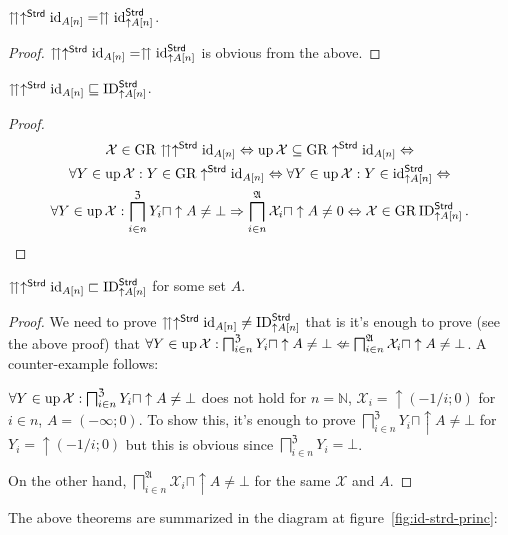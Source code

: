 \begin{prop}
$\upuparrows\uparrow^{\mathsf{Strd}}\operatorname{id}_{A[n]}=\upuparrows\operatorname{id}_{\uparrow A[n]}^{\mathsf{Strd}}$.\end{prop}
\begin{proof}
$\upuparrows\uparrow^{\mathsf{Strd}}\operatorname{id}_{A[n]}=\upuparrows\operatorname{id}_{\uparrow A[n]}^{\mathsf{Strd}}$
is obvious from the above.\end{proof}
\begin{prop}
$\upuparrows\uparrow^{\mathsf{Strd}}\operatorname{id}_{A[n]}\sqsubseteq\operatorname{ID}_{\uparrow A[n]}^{\mathsf{Strd}}$.\end{prop}
\begin{proof}
~
\begin{multline*}
\mathcal{X}\in\operatorname{GR}\upuparrows\uparrow^{\mathsf{Strd}}\operatorname{id}_{A[n]}\Leftrightarrow\operatorname{up}\mathcal{X}\subseteq\operatorname{GR}\uparrow^{\mathsf{Strd}}\operatorname{id}_{A[n]}\Leftrightarrow\\
\forall Y\in\operatorname{up}\mathcal{X}:Y\in\operatorname{GR}\uparrow^{\mathsf{Strd}}\operatorname{id}_{A[n]}\Leftrightarrow\forall Y\in\operatorname{up}\mathcal{X}:Y\in\operatorname{id}_{\uparrow A[n]}^{\mathsf{Strd}}\Leftrightarrow\\
\forall Y\in\operatorname{up}\mathcal{X}:\bigsqcap_{i\in n}^{\mathfrak{Z}}Y_{i}\sqcap\uparrow A\neq\bot\Rightarrow\bigsqcap_{i\in n}^{\mathfrak{A}}\mathcal{X}_{i}\sqcap\uparrow A\neq0\Leftrightarrow\mathcal{X}\in\operatorname{GR}\operatorname{ID}_{\uparrow A[n]}^{\mathsf{Strd}}.
\end{multline*}
\end{proof}
\begin{prop}
$\upuparrows\uparrow^{\mathsf{Strd}}\operatorname{id}_{A[n]}\sqsubset\operatorname{ID}_{\uparrow A[n]}^{\mathsf{Strd}}$
for some set $A$.\end{prop}
\begin{proof}
We need to prove $\upuparrows\uparrow^{\mathsf{Strd}}\operatorname{id}_{A[n]}\neq\operatorname{ID}_{\uparrow A[n]}^{\mathsf{Strd}}$
that is it's enough to prove (see the above proof) that $\forall Y\in\operatorname{up}\mathcal{X}:\bigsqcap_{i\in n}^{\mathfrak{Z}}Y_{i}\sqcap\uparrow A\neq\bot\nLeftarrow\bigsqcap_{i\in n}^{\mathfrak{A}}\mathcal{X}_{i}\sqcap\uparrow A\neq\bot$.
A counter-example follows:

$\forall Y\in\operatorname{up}\mathcal{X}:\bigsqcap_{i\in n}^{\mathfrak{Z}}Y_{i}\sqcap\uparrow A\neq\bot$
does not hold for $n=\mathbb{N}$, $\mathcal{X}_{i}=\uparrow(-1/i;0)$
for $i\in n$, $A=(-\infty;0)$. To show this, it's enough to prove
$\bigsqcap_{i\in n}^{\mathfrak{Z}}Y_{i}\sqcap\uparrow A\neq\bot$
for $Y_{i}=\uparrow(-1/i;0)$ but this is obvious since $\bigsqcap_{i\in n}^{\mathfrak{Z}}Y_{i}=\bot$.

On the other hand, $\bigsqcap_{i\in n}^{\mathfrak{A}}\mathcal{X}_{i}\sqcap\uparrow A\neq\bot$
for the same $\mathcal{X}$ and $A$.
\end{proof}
The above theorems are summarized in the diagram at figure~\ref{fig:id-strd-princ}:

